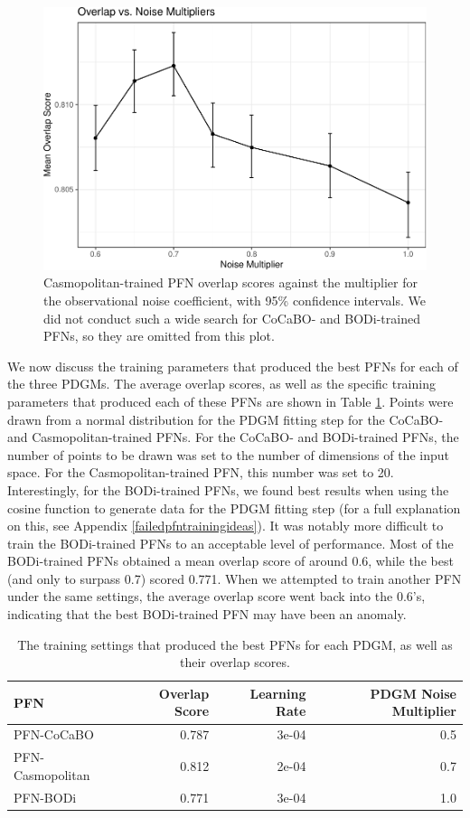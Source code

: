 \documentclass[12pt,twoside]{reedthesis}
\begin{document}
\begin{figure}
\centering
\includegraphics{thesis_files/figure-latex/overlap-vs-noise-coef-1.pdf}
\caption{\label{fig:overlap-vs-noise-coef}Casmopolitan-trained PFN overlap scores against the multiplier for the observational noise coefficient, with 95\% confidence intervals. We did not conduct such a wide search for CoCaBO- and BODi-trained PFNs, so they are omitted from this plot.}
\end{figure}
We now discuss the training parameters that produced the best PFNs for each of the three PDGMs. The average overlap scores, as well as the specific training parameters that produced each of these PFNs are shown in Table \ref{tab:evalTrainingSettings}. Points were drawn from a normal distribution for the PDGM fitting step for the CoCaBO- and Casmopolitan-trained PFNs. For the CoCaBO- and BODi-trained PFNs, the number of points to be drawn was set to the number of dimensions of the input space. For the Casmopolitan-trained PFN, this number was set to 20. Interestingly, for the BODi-trained PFNs, we found best results when using the cosine function to generate data for the PDGM fitting step (for a full explanation on this, see Appendix \ref{failedpfntrainingideas}). It was notably more difficult to train the BODi-trained PFNs to an acceptable level of performance. Most of the BODi-trained PFNs obtained a mean overlap score of around 0.6, while the best (and only to surpass 0.7) scored 0.771. When we attempted to train another PFN under the same settings, the average overlap score went back into the 0.6's, indicating that the best BODi-trained PFN may have been an anomaly.
\begin{table}

\caption{\label{tab:evalTrainingSettings}The training settings that produced the best PFNs for each PDGM, as well as their overlap scores.}
\centering
\begin{tabular}[t]{l|r|r|r}
\hline
PFN & Overlap Score & Learning Rate & PDGM Noise Multiplier\\
\hline
PFN-CoCaBO & 0.787 & 3e-04 & 0.5\\
\hline
PFN-Casmopolitan & 0.812 & 2e-04 & 0.7\\
\hline
PFN-BODi & 0.771 & 3e-04 & 1.0\\
\hline
\end{tabular}
\end{table}
\end{document}
